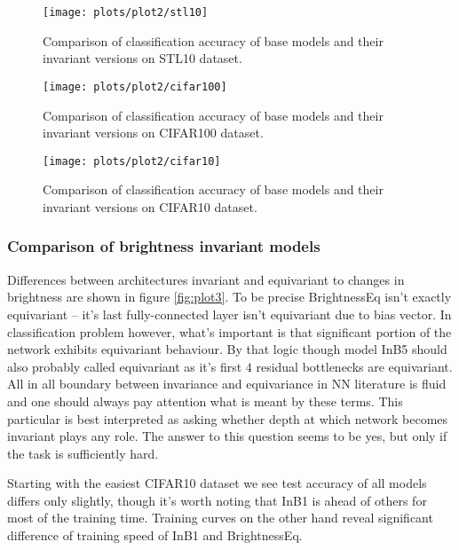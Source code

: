     \clearpage

    \begin{figure}[h!]
        \centering
        \texttt{[image: plots/plot2/stl10]}
        \caption{Comparison of classification accuracy of base models and their
            invariant versions on STL10 dataset.}
        \label{fig:plot2stl10}
    \end{figure}
    \begin{figure}[h!]
        \centering
        \texttt{[image: plots/plot2/cifar100]}
        \caption{Comparison of classification accuracy of base models and their
            invariant versions on CIFAR100 dataset.}
        \label{fig:plot2cifar100}
    \end{figure}
    \begin{figure}[h!]
        \centering
        \texttt{[image: plots/plot2/cifar10]}
        \caption{Comparison of classification accuracy of base models and their
            invariant versions on CIFAR10 dataset.}
        \label{fig:plot2cifar10}
    \end{figure}




    \subsubsection*{Comparison of brightness invariant models}
    Differences between architectures invariant and
    equivariant to changes in brightness are shown in figure \ref{fig:plot3}.
    To be precise BrightnessEq isn't
    exactly equivariant -- it's last fully-connected layer isn't equivariant due
    to bias vector. In classification problem however, what's important
    is that significant portion of the network exhibits equivariant behaviour.
    By that logic though model InB5 should also probably called equivariant as
    it's first $4$ residual bottlenecks are equivariant. All in all boundary
    between invariance and equivariance in NN literature is fluid and one should
    always pay attention what is meant by these terms. This particular is best
    interpreted as asking whether depth at which network becomes invariant plays
    any role. The answer to this question seems to be yes, but only if the task
    is sufficiently hard.

    Starting with the easiest CIFAR10 dataset we see test accuracy of all models
    differs only slightly, though it's worth noting that InB1 is ahead of others
    for most of the training time. Training curves on the other hand reveal
    significant difference of training speed of InB1 and BrightnessEq.

